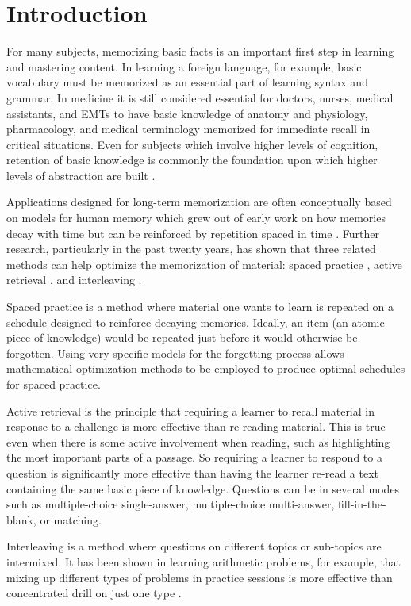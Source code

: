 \documentclass[runningheads,a4paper]{llncs}
\begin{document}
\section{Introduction}

For many subjects, memorizing basic facts is an important first step in learning and mastering content.  In learning a foreign language, for example, basic vocabulary must be memorized as an essential part of learning syntax and grammar.  In medicine it is still considered essential for doctors, nurses, medical assistants, and EMTs to have basic knowledge of anatomy and physiology, pharmacology, and medical terminology memorized for immediate recall in critical situations.  Even for subjects which involve higher levels of cognition, retention of basic knowledge is commonly the foundation upon which higher levels of abstraction are built \cite{blume1956}.

Applications designed for long-term memorization are often conceptually based on models for human memory which grew out of early work on how memories decay with time but can be reinforced by repetition spaced in time \cite{ebbinghaus}.  Further research, particularly in the past twenty years, has shown that three related methods can help optimize the memorization of material:  spaced practice \cite{cepeda2008}, active retrieval  \cite{roediger2006,karpicke2008}, and interleaving \cite{stick2014}.

Spaced practice is a method where material one wants to learn is repeated on a schedule designed to reinforce decaying memories.  Ideally, an item (an atomic piece of knowledge) would be repeated just before it would otherwise be forgotten.  Using very specific models for the forgetting process allows mathematical optimization methods to be employed to produce optimal schedules for spaced practice\cite{pa2005,pa2008,mozer2016,settles2016}.

Active retrieval is the principle that requiring a learner to recall material in response to a challenge is more effective than re-reading material.   This is true even when there is some active involvement when reading, such as highlighting the most important parts of a passage.  So requiring a learner to respond to a question is significantly more effective than having the learner re-read a text containing the same basic piece of knowledge.  Questions can be in several modes such as multiple-choice single-answer, multiple-choice multi-answer, fill-in-the-blank, or matching.

Interleaving is a method where questions on different topics or sub-topics are intermixed.  It has been shown in learning arithmetic problems, for example, that mixing up different types of problems in practice sessions is more effective than concentrated drill on just one type \cite{rohrer2007}.
\end{document}
